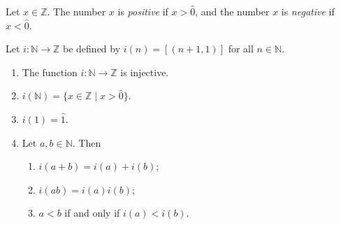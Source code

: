 \begin{definition} %
	Let $x \in \mathbb{Z}$. The number $x$ is \emph{positive} if $x > \hat{0}$, and the number $x$ is \emph{negative} if $x < \hat{0}$.
\end{definition}

\begin{theorem} %
	\label{int:t:nat_int}
	Let $i: \mathbb{N} \to \mathbb{Z}$ be defined by $i(n) = [(n + 1, 1)]$ for all $n \in \mathbb{N}$.
	\begin{enumerate}
		\item \label{int:t:nat_int:1}
		      The function $i: \mathbb{N} \to \mathbb{Z}$ is injective.
		\item \label{int:t:nat_int:2}
		      $i(\mathbb{N})=\{x \in \mathbb{Z} \mid x>\hat{0}\}$.
		\item \label{int:t:nat_int:3}
		      $i(1) = \hat{1}$.
		\item \label{int:t:nat_int:4}
		      Let $a, b \in \mathbb{N}$. Then

		      \begin{enumerate}
			      \item \label{int:t:nat_int:4:1}
			            $i(a + b) = i(a) + i(b)$;
			      \item \label{int:t:nat_int:4:2}
			            $i(a b) = i(a) i(b)$;
			      \item \label{int:t:nat_int:4:3}
			            $a < b$ if and only if $i(a) < i(b)$.
		      \end{enumerate}
	\end{enumerate}
\end{theorem}


